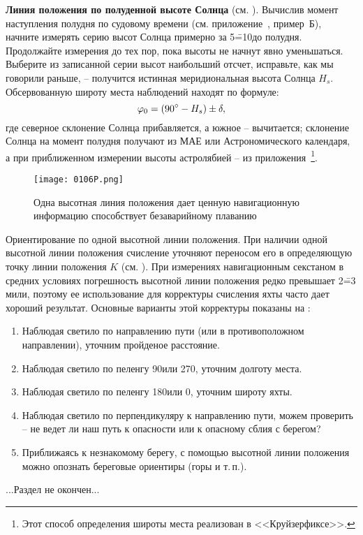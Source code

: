 \textbf{Линия положения по полуденной высоте Солнца}
(см. ). Вычислив момент наступления полудня по судовому
времени (см. приложение~, пример~Б), начните измерять серию
высот Солнца примерно за 5\==10\tmin до полудня. Продолжайте измерения
до тех пор, пока высоты не начнут явно уменьшаться. Выберите из
записанной серии высот наибольший отсчет, исправьте, как мы говорили
раньше, \--- получится истинная меридиональная высота Солнца
$H_s$. Обсервованную широту места наблюдений находят по формуле:
%
\begin{equation}
  \label{eq:75}
  \varphi_0 = (90^\circ - H_s) \pm \delta,
\end{equation}
% 
где северное склонение Солнца прибавляется, а южное \--- вычитается;
склонение Солнца на момент полудня получают из МАЕ или
Астрономического календаря, а при приближенном измерении высоты
астролябией \--- из приложения~\footnote{Этот способ
  определения широты места реализован в <<Круйзерфиксе>>.}.

\begin{figure*}[!htb]
  \centering
  \texttt{[image: 0106P.png]}
  \caption[Одна высотная линия положения]{Одна высотная линия положения дает ценную навигационную информацию способствует безаварийному плаванию}
  \label{fig:106}
\end{figure*}

Ориентирование по одной высотной линии положения. При наличии одной
высотной линии положения счисление уточняют переносом его в
определяющую точку линии положения $K$ (см. ). При измерениях
навигационным секстаном в средних условиях погрешность высотной линии
положения редко превышает 2\==3 мили, поэтому ее использование для
корректуры счисления яхты часто дает хороший результат. Основные
варианты этой корректуры показаны на :

\begin{enumerate}
\item Наблюдая светило по направлению пути (или в противоположном
  направлении), уточним пройденое расстояние.
\item Наблюдая светило по пеленгу 90\gr или 270\gr, уточним долготу
  места.
\item Наблюдая светило по пеленгу 180\gr или 0\gr, уточним широту
  яхты.
\item Наблюдая светило по перпендикуляру к направлению пути, можем
  проверить \--- не ведет ли наш путь к опасности или к опасному сблия
  с берегом?
\item Приближаясь к незнакомому берегу, с помощью высотной линии
  положения можно опознать береговые ориентиры (горы и т.\,п.).
\end{enumerate}

...Раздел не окончен...

\onecolumn

